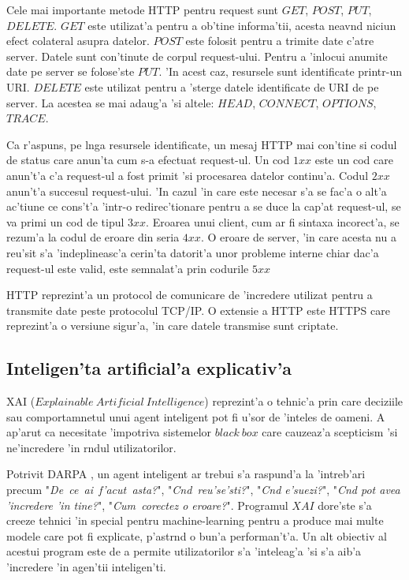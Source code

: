 \documentclass[12pt,a4paper,twoside]{report}
\begin{document}
Cele mai importante metode HTTP pentru request sunt $GET$, $POST$, $PUT$, $DELETE$.
 $GET$ este utilizat'a pentru a ob'tine informa'tii, acesta neav\ia nd niciun efect colateral asupra datelor.
 $POST$ este folosit pentru a trimite date c'atre server. Datele sunt con'tinute de corpul request-ului.
 Pentru a 'inlocui anumite date pe server se folose'ste $PUT$. 'In acest caz, resursele sunt identificate printr-un URI. $DELETE$ este utilizat pentru a 'sterge datele identificate de URI de pe server.
La acestea se mai adaug'a 'si altele: $HEAD$, $CONNECT$, $OPTIONS$, $TRACE$.

Ca r'aspuns, pe l\ia nga resursele identificate, un mesaj HTTP mai con'tine si codul de status care anun'ta cum s-a efectuat request-ul. Un cod $1xx$ este un cod care anun't'a c'a request-ul a fost primit 'si procesarea datelor continu'a. Codul $2xx$ anun't'a succesul request-ului. 'In cazul 'in care este necesar s'a se fac'a o alt'a ac'tiune ce cons't'a 'intr-o redirec'tionare pentru a se duce la cap'at request-ul, se va primi un cod de tipul $3xx$. Eroarea unui client, cum ar fi sintaxa incorect'a, se rezum'a la codul de eroare din seria $4xx$. O eroare de server, 'in care acesta nu a reu'sit s'a 'indeplineasc'a cerin'ta datorit'a unor probleme interne chiar dac'a request-ul este valid, este semnalat'a prin codurile $5xx$

HTTP reprezint'a un protocol de comunicare de 'incredere utilizat pentru a transmite date peste protocolul TCP/IP. O extensie a HTTP este HTTPS care reprezint'a o versiune sigur'a, 'in care datele transmise sunt criptate.


\subsection{Inteligen'ta artificial'a explicativ'a}

XAI ($Explainable\ Artificial\ Intelligence$) reprezint'a o tehnic'a prin care deciziile sau comportamnetul unui agent inteligent pot fi u'sor de 'inteles de oameni. A ap'arut ca necesitate 'impotriva sistemelor $black\ box$ care cauzeaz'a scepticism 'si ne'incredere 'in r\ia ndul utilizatorilor.

Potrivit DARPA \cite{darpaXAI}, un agent inteligent ar trebui s'a raspund'a la 'intreb'ari precum 
"{\it De\ ce\ ai\ f'acut\ asta?}", 
"{\it C\ia nd\ reu'se'sti?}", 
"{\it C\ia nd e'suezi?}", 
"{\it C\ia nd pot avea 'incredere 'in tine?}", 
"{\it Cum\ corectez o eroare?}". Programul $XAI$ dore'ste s'a creeze tehnici 'in special pentru machine-learning pentru a produce mai multe modele care pot fi explicate, p'astr\ia nd o bun'a performan't'a. Un alt obiectiv al acestui program este de a permite utilizatorilor s'a 'inteleag'a 'si s'a aib'a 'incredere 'in agen'tii inteligen'ti.
\end{document}
